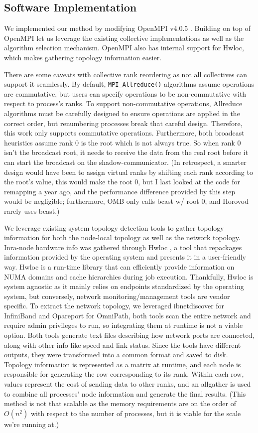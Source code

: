 \subsection{Software Implementation}\label{sec:CH4-soft-impl}
We implemented our method by modifying OpenMPI v4.0.5 \cite{gabriel2004OpenMPI}.
Building on top of OpenMPI let us leverage the existing collective implementations as well as the algorithm selection mechanism.
OpenMPI also has internal support for Hwloc, which makes gathering topology information easier.

There are some caveats with collective rank reordering as not all collectives can support it seamlessly.
By default, \texttt{MPI\_Allreduce()} algorithms assume operations are commutative, but users can specify operations to be non-commutative with respect to process's ranks. 
To support non-commutative operations, Allreduce algorithms must be carefully designed to ensure operations are applied in the correct order, but renumbering processes break that careful design.
Therefore, this work only supports commutative operations.
Furthermore, both broadcast heuristics assume rank 0 is the root which is not always true. 
So when rank 0 isn't the broadcast root, it needs to receive the data from the real root before it can start the broadcast on the shadow-communicator.
(In retrospect, a smarter design would have been to assign virtual ranks by shifting each rank according to the root's value, this would make the root 0, but I last looked at the code for remapping a year ago, and the performance difference provided by this step would be negligible; furthermore, OMB only calls bcast w/ root 0, and Horovod rarely uses bcast.)

We leverage existing system topology detection tools to gather topology information for both the node-local topology as well as the network topology.
Inra-node hardware info was gathered through Hwloc \cite{Broquedis2010hwloc}, a tool that repackages information provided by the operating system and presents it in a user-friendly way.
Hwloc is a run-time library that can efficiently provide information on NUMA domains and cache hierarchies during job execution.
Thankfully, Hwloc is system agnostic as it mainly relies on endpoints standardized by the operating system, but conversely, network monitoring/management tools are vendor specific.
To extract the network topology, we leveraged ibnetdiscover for InfiniBand and Opareport for OmniPath, both tools scan the entire network and require admin privileges to run, so integrating them at runtime is not a viable option.
Both tools generate text files describing how network ports are connected, along with other info like speed and link status.
Since the tools have different outputs, they were transformed into a common format and saved to disk.
Topology information is represented as a matrix at runtime, and each node is responsible for generating the row corresponding to its rank.
Within each row, values represent the cost of sending data to other ranks, and an allgather is used to combine all processes' node information and generate the final results.
(This method is not that scalable as the memory requirements are on the order of $O(n^2)$ with respect to the number of processes, but it is viable for the scale we're running at.)

